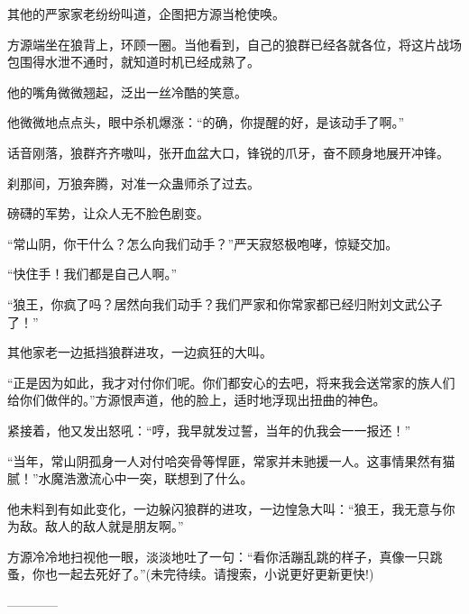 \begin{this_body}
其他的严家家老纷纷叫道，企图把方源当枪使唤。

方源端坐在狼背上，环顾一圈。当他看到，自己的狼群已经各就各位，将这片战场包围得水泄不通时，就知道时机已经成熟了。

他的嘴角微微翘起，泛出一丝冷酷的笑意。

他微微地点点头，眼中杀机爆涨：“的确，你提醒的好，是该动手了啊。”

话音刚落，狼群齐齐嗷叫，张开血盆大口，锋锐的爪牙，奋不顾身地展开冲锋。

刹那间，万狼奔腾，对准一众蛊师杀了过去。

磅礴的军势，让众人无不脸色剧变。

“常山阴，你干什么？怎么向我们动手？”严天寂怒极咆哮，惊疑交加。

“快住手！我们都是自己人啊。”

“狼王，你疯了吗？居然向我们动手？我们严家和你常家都已经归附刘文武公子了！”

其他家老一边抵挡狼群进攻，一边疯狂的大叫。

“正是因为如此，我才对付你们呢。你们都安心的去吧，将来我会送常家的族人们给你们做伴的。”方源恨声道，他的脸上，适时地浮现出扭曲的神色。

紧接着，他又发出怒吼：“哼，我早就发过誓，当年的仇我会一一报还！”

“当年，常山阴孤身一人对付哈突骨等悍匪，常家并未驰援一人。这事情果然有猫腻！”水魔浩激流心中一突，联想到了什么。

他未料到有如此变化，一边躲闪狼群的进攻，一边惶急大叫：“狼王，我无意与你为敌。敌人的敌人就是朋友啊。”

方源冷冷地扫视他一眼，淡淡地吐了一句：“看你活蹦乱跳的样子，真像一只跳蚤，你也一起去死好了。”(未完待续。请搜索，小说更好更新更快!)

------------

\end{this_body}


